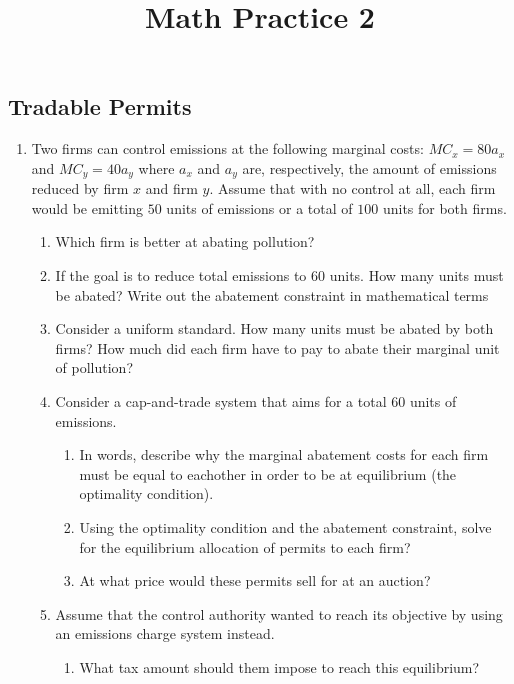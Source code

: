 \documentclass[11pt]{article}
\title{Math Practice 2}
\begin{document}
\subsection*{Tradable Permits}

\begin{enumerate}
  \item Two firms can control emissions at the following marginal costs: $MC_x = 80a_x$ and $MC_y = 40 a_y$ where $a_x$ and $a_y$ are, respectively, the amount of emissions reduced by firm $x$ and firm $y$. Assume that with no control at all, each firm would be emitting $50$ units of emissions or a total of $100$ units for both firms.

  \begin{enumerate}
    \item Which firm is better at abating pollution?
    
    \item If the goal is to reduce total emissions to $60$ units. How many units must be abated? Write out the abatement constraint in mathematical terms
    
    \item Consider a uniform standard. How many units must be abated by both firms? How much did each firm have to pay to abate their marginal unit of pollution?
  
    \item Consider a cap-and-trade system that aims for a total $60$ units of emissions. 
    \begin{enumerate}
      \item In words, describe why the marginal abatement costs for each firm must be equal to eachother in order to be at equilibrium (the optimality condition). 
      
      \item Using the optimality condition and the abatement constraint, solve for the equilibrium allocation of permits to each firm?
  
      \item At what price would these permits sell for at an auction?
    \end{enumerate}
  
    \item Assume that the control authority wanted to reach its objective by using an emissions charge system instead.
    \begin{enumerate}
      \item What tax amount should them impose to reach this equilibrium?
      

\end{enumerate}
\end{enumerate}
\end{enumerate}
\end{document}
